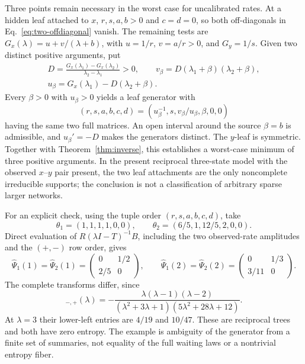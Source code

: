 Three points remain necessary in the worst case for uncalibrated rates.
At a hidden leaf attached to $x$, $r,s,a,b>0$ and $c=d=0$, so both
off-diagonals in Eq.~\eqref{eq:two-offdiagonal} vanish. The remaining tests are
$G_x(\lambda)=u+v/(\lambda+b)$, with $u=1/r$, $v=a/r>0$, and $G_y=1/s$.
Given two distinct positive arguments, put
\begin{gather}
 D=\frac{G_x(\lambda_1)-G_x(\lambda_2)}{\lambda_2-\lambda_1}>0,\qquad
 v_\beta=D(\lambda_1+\beta)(\lambda_2+\beta),\\
 u_\beta=G_x(\lambda_1)-D(\lambda_2+\beta).
\end{gather}
Every $\beta>0$ with $u_\beta>0$ yields a leaf generator with
\begin{equation}
 (r,s,a,b,c,d)=(u_\beta^{-1},s,v_\beta/u_\beta,\beta,0,0)
 \label{eq:two-leaf-family}
\end{equation}
having the same two full matrices. An open interval around the source
$\beta=b$ is admissible, and $u_\beta'=-D$ makes the generators distinct.
The $y$-leaf is symmetric. Together with Theorem~\ref{thm:inverse}, this
establishes a worst-case minimum of three positive arguments. In the present
reciprocal three-state model with the observed $x$--$y$ pair present, the two
leaf attachments are the only noncomplete irreducible supports; the conclusion
is not a classification of arbitrary sparse larger networks.

For an explicit check, using the tuple order \emph{$(r,s,a,b,c,d)$}, take
\begin{equation}
 \theta_1=(1,1,1,1,0,0),\qquad
 \theta_2=(6/5,1,12/5,2,0,0).
\end{equation}
Direct evaluation of $R(\lambda I-T)^{-1}B$, including the two observed-rate
amplitudes and the $(+,-)$ row order, gives
\begin{equation}
 \widehat\Psi_1(1)=\widehat\Psi_2(1)=
 \begin{pmatrix}0&1/2\\2/5&0\end{pmatrix},\qquad
 \widehat\Psi_1(2)=\widehat\Psi_2(2)=
 \begin{pmatrix}0&1/3\\3/11&0\end{pmatrix}.
 \label{eq:two-leaf-counterexample}
\end{equation}
The complete transforms differ, since
\begin{equation}
 [\widehat\Psi_1-\widehat\Psi_2]_{-,+}(\lambda)
 =-\frac{\lambda(\lambda-1)(\lambda-2)}
 {(\lambda^2+3\lambda+1)(5\lambda^2+28\lambda+12)}.
\end{equation}
At $\lambda=3$ their lower-left entries are $4/19$ and $10/47$.
These are reciprocal trees and both have zero entropy. The example is
ambiguity of the generator from a finite set of summaries, not equality of
the full waiting laws or a nontrivial entropy fiber.

